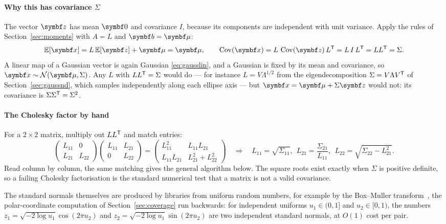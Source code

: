 \documentclass[11pt]{article}
\begin{document}
\paragraph{Why this has covariance $\Sigma$} The vector $\vect{z}$ has mean $\vect{0}$ and covariance $I$, because its
components are independent with unit variance. Apply the rules of Section~\ref{sec:moments} with $A = L$ and
$\vect{b} = \vmu$:
\[
  \E[\x] = L\,\E[\vect{z}] + \vmu = \vmu, \qquad
  \Cov(\x) = L\,\Cov(\vect{z})\,L\T = L\,I\,L\T = LL\T = \Sigma .
\]
A linear map of a Gaussian vector is again Gaussian \eqref{eq:gausslin}, and a Gaussian is fixed by its mean and covariance, so
$\x \sim \Normal(\vmu, \Sigma)$. Any $L$ with $LL^{\mathsf{T}} = \Sigma$ would do --- for instance $L = V\Lambda^{1/2}$ from the
eigendecomposition $\Sigma = V\Lambda V^{\mathsf{T}}$ of Section~\ref{sec:gaussnd}, which samples independently along each ellipse axis --- but $\x = \vmu +
\Sigma\vect{z}$ would not: its covariance is $\Sigma\Sigma^{\mathsf{T}} = \Sigma^2$.

\paragraph{The Cholesky factor by hand} For a $2 \times 2$ matrix, multiply out $LL^{\mathsf{T}}$ and match entries:
\[
  \begin{pmatrix} L_{11} & 0 \\ L_{21} & L_{22} \end{pmatrix}
  \begin{pmatrix} L_{11} & L_{21} \\ 0 & L_{22} \end{pmatrix}
  = \begin{pmatrix} L_{11}^2 & L_{11}L_{21} \\ L_{11}L_{21} & L_{21}^2 + L_{22}^2 \end{pmatrix}
  \quad\Longrightarrow\quad
  L_{11} = \sqrt{\Sigma_{11}}, \ \ L_{21} = \frac{\Sigma_{21}}{L_{11}}, \ \
  L_{22} = \sqrt{\Sigma_{22} - L_{21}^2} .
\]
Read column by column, the same matching gives the general algorithm below. The square roots exist exactly when
$\Sigma$ is positive definite, so a failing Cholesky factorisation is the standard numerical test that a matrix is
not a valid covariance.

The standard normals themselves are produced by libraries from uniform random numbers, for example by the
Box--Muller transform~\cite{boxmuller1958}, the polar-coordinate computation of Section~\ref{sec:coverage} run
backwards: for independent uniforms $u_1 \in (0, 1]$ and $u_2 \in [0, 1)$, the numbers $z_1 = \sqrt{-2\log u_1}\cos(2\pi
u_2)$ and $z_2 = \sqrt{-2\log u_1}\sin(2\pi u_2)$ are two independent standard normals, at $O(1)$ cost per pair.
\end{document}
